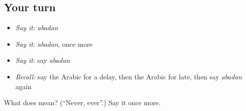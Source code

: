 \subsection*{Your turn}
\begin{itemize}
\raggedright
  \item \emph{Say it:} \emph{abadan}
  \item \emph{Say it:} \emph{abadan}, once more
  \item \emph{Say it:} say \emph{abadan}
  \item \emph{Recall:} say the Arabic for a delay, then the Arabic for late, then say \emph{abadan} again
\end{itemize}

\begin{tcolorbox}[breakable,colback=teal!4,colframe=teal!35!black,title={Before you move on}]
What does  mean? (\textquotedblleft{}Never, ever\textquotedblright{}.) Say it once more.
\end{tcolorbox}
